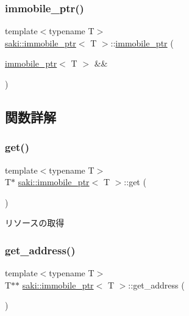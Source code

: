 \subsubsection{\texorpdfstring{immobile\+\_\+ptr()}{immobile\_ptr()}\hspace{0.1cm}{\footnotesize\ttfamily [3/3]}}
{\footnotesize\ttfamily template$<$typename T$>$ \\
\mbox{\hyperlink{classsaki_1_1immobile__ptr}{saki\+::immobile\+\_\+ptr}}$<$ T $>$\+::\mbox{\hyperlink{classsaki_1_1immobile__ptr}{immobile\+\_\+ptr}} (\begin{DoxyParamCaption}\item[{\mbox{\hyperlink{classsaki_1_1immobile__ptr}{immobile\+\_\+ptr}}$<$ T $>$ \&\&}]{ }\end{DoxyParamCaption})\hspace{0.3cm}{\ttfamily [delete]}}



\subsection{関数詳解}
\mbox{\label{classsaki_1_1immobile__ptr_a41956c8a6ba8fd9fb3cb092d94da5ea8}} 
\subsubsection{\texorpdfstring{get()}{get()}}
{\footnotesize\ttfamily template$<$typename T$>$ \\
T$\ast$ \mbox{\hyperlink{classsaki_1_1immobile__ptr}{saki\+::immobile\+\_\+ptr}}$<$ T $>$\+::get (\begin{DoxyParamCaption}{ }\end{DoxyParamCaption})\hspace{0.3cm}{\ttfamily [inline]}}



リソースの取得 

\mbox{\label{classsaki_1_1immobile__ptr_a2d4f142600717223e0855d8a977e7429}} 
\subsubsection{\texorpdfstring{get\+\_\+address()}{get\_address()}}
{\footnotesize\ttfamily template$<$typename T$>$ \\
T$\ast$$\ast$ \mbox{\hyperlink{classsaki_1_1immobile__ptr}{saki\+::immobile\+\_\+ptr}}$<$ T $>$\+::get\+\_\+address (\begin{DoxyParamCaption}{ }\end{DoxyParamCaption})\hspace{0.3cm}{\ttfamily [inline]}}




